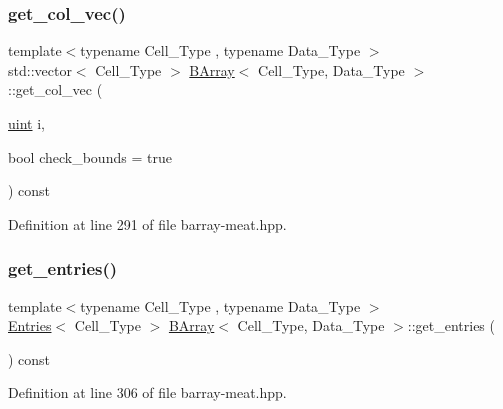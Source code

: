\subsubsection{\texorpdfstring{get\+\_\+col\+\_\+vec()}{get\_col\_vec()}}
{\footnotesize\ttfamily template$<$typename Cell\+\_\+\+Type , typename Data\+\_\+\+Type $>$ \\
std\+::vector$<$ Cell\+\_\+\+Type $>$ \hyperlink{class_b_array}{B\+Array}$<$ Cell\+\_\+\+Type, Data\+\_\+\+Type $>$\+::get\+\_\+col\+\_\+vec (\begin{DoxyParamCaption}\item[{\hyperlink{typedefs_8hpp_a91ad9478d81a7aaf2593e8d9c3d06a14}{uint}}]{i,  }\item[{bool}]{check\+\_\+bounds = {\ttfamily true} }\end{DoxyParamCaption}) const\hspace{0.3cm}{\ttfamily [inline]}}



Definition at line 291 of file barray-\/meat.\+hpp.

\mbox{\label{class_b_array_aee224325422d214624771a5b4d91b55e}} 
\subsubsection{\texorpdfstring{get\+\_\+entries()}{get\_entries()}}
{\footnotesize\ttfamily template$<$typename Cell\+\_\+\+Type , typename Data\+\_\+\+Type $>$ \\
\hyperlink{class_entries}{Entries}$<$ Cell\+\_\+\+Type $>$ \hyperlink{class_b_array}{B\+Array}$<$ Cell\+\_\+\+Type, Data\+\_\+\+Type $>$\+::get\+\_\+entries (\begin{DoxyParamCaption}{ }\end{DoxyParamCaption}) const\hspace{0.3cm}{\ttfamily [inline]}}



Definition at line 306 of file barray-\/meat.\+hpp.

\mbox{\label{class_b_array_a2c969ceb1d37eff9ebcac25741de1808}} 
